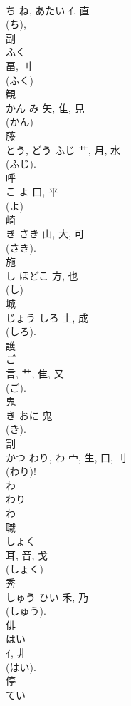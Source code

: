 \documentclass[8pt]{extreport}
\begin{document}
\begin{CJK}{UTF8}{min}
\\	ち	ね, あたい	ｲ, 直	
\\	(ち), 
\\	副	
\\	ふく	
\\	畐, 刂	
\\	(ふく) 
\\	観	
\\	かん	み	矢, 隹, 見	
\\	(かん) 
\\	藤	
\\	とう, どう	ふじ	艹, 月, 水		
\\	(ふじ).	
\\	呼	
\\	こ	よ	口, 平	
\\	(よ) 
\\	崎	
\\	き	さき	山, 大, 可	
\\	(さき). 
\\	施	
\\	し	ほどこ	方, 也		
\\	(し) 
\\	城	
\\	じょう	しろ	土, 成	
\\	(しろ). 
\\	護	
\\	ご	
\\	言, 艹, 隹, 又	
\\	(ご). 
\\	鬼	
\\	き	おに	鬼	
\\	(き). 
\\	割	
\\	かつ	わり, わ	宀, 生, 口, 刂	
\\	(わり)! 
\\	わ 
\\	わり
\\	わ
\\	職	
\\	しょく	
\\	耳, 音, 戈	
\\	(しょく) 
\\	秀	
\\	しゅう	ひい	禾, 乃	
\\	(しゅう).	
\\	俳	
\\	はい	
\\	ｲ, 非	
\\	(はい). 
\\	停	
\\	てい	

\end{CJK}
\end{document}
